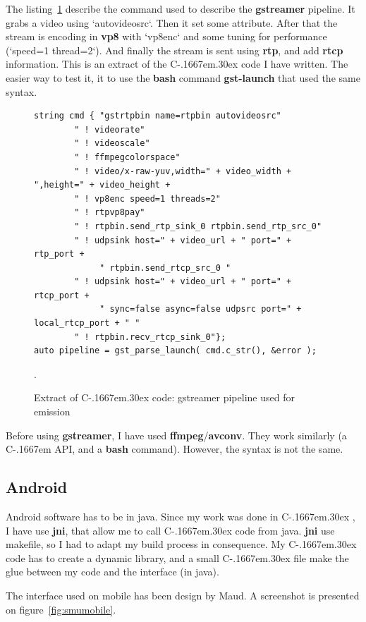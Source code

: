 \documentclass[a4paper,11pt]{custom}
\newcommand{\rtp}{\textbf{rtp}\xspace}
\newcommand{\rtcp}{\textbf{rtcp}\xspace}
\newcommand{\avconv}{\textbf{avconv}\xspace}
\newcommand{\ffmpeg}{\textbf{ffmpeg}\xspace}
\newcommand{\gstreamer}{\textbf{gstreamer}\xspace}
\newcommand{\vpx}{\textbf{vp8}\xspace}
\newcommand{\jni}{\textbf{jni}\xspace}
\newcommand{\bash}{\textbf{bash}\xspace}
\newcommand{\command}[1]{\textbf{#1}\xspace}
\newcommand{\cpp}{%
  C\kern-.1667em\raise.30ex\hbox{\smaller{++}}%
  \spacefactor1000\xspace%
}
\newcommand{\clang}{%
  C\kern-.1667em%
  \xspace%
}
\begin{document}
The listing~\ref{fig:exctractcppcode} describe the command used to describe the
\gstreamer pipeline. It grabs a video using `autovideosrc`. Then it set some
attribute. After that the stream is encoding in \vpx with `vp8enc` and some
tuning for performance (`speed=1 thread=2`). And finally the stream is sent
using \rtp, and add \rtcp information. This is an extract of the \cpp code
I have written. The easier way to test it, it to use the \bash command
\command{gst-launch} that used the same syntax.

\begin{figure}
\begin{lstlisting}
string cmd { "gstrtpbin name=rtpbin autovideosrc"
        " ! videorate"
        " ! videoscale"
        " ! ffmpegcolorspace"
        " ! video/x-raw-yuv,width=" + video_width + ",height=" + video_height +
        " ! vp8enc speed=1 threads=2"
        " ! rtpvp8pay"
        " ! rtpbin.send_rtp_sink_0 rtpbin.send_rtp_src_0"
        " ! udpsink host=" + video_url + " port=" + rtp_port +
             " rtpbin.send_rtcp_src_0 "
        " ! udpsink host=" + video_url + " port=" + rtcp_port +
             " sync=false async=false udpsrc port=" + local_rtcp_port + " "
        " ! rtpbin.recv_rtcp_sink_0"};
auto pipeline = gst_parse_launch( cmd.c_str(), &error );
\end{lstlisting}
\label{fig:exctractcppcode}
\caption{Extract of \cpp code: gstreamer pipeline used for emission}.
\end{figure}

Before using \gstreamer, I have used \ffmpeg/\avconv. They work similarly (a
\clang API, and a \bash command). However, the syntax is not the same.

\subsection{Android}

Android software has to be in java. Since my work was done in \cpp, I have use
\jni, that allow me to call \cpp code from java. \jni use makefile, so I had to
adapt my build process in consequence. My \cpp code has to create a dynamic
library, and a small \cpp file make the glue between my code and the interface
(in java).

The interface used on mobile has been design by Maud. A screenshot is presented
on figure~\ref{fig:smumobile}.
\end{document}
